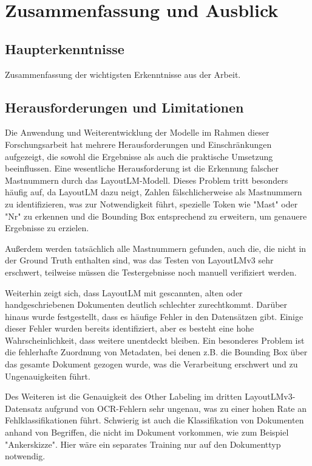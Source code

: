\documentclass[12pt,a4paper,twoside]{article}
\begin{document}
\section{Zusammenfassung und Ausblick}
\subsection{Haupterkenntnisse}
Zusammenfassung der wichtigsten Erkenntnisse aus der Arbeit.

\subsection{Herausforderungen und Limitationen}
Die Anwendung und Weiterentwicklung der Modelle im Rahmen dieser Forschungsarbeit hat mehrere Herausforderungen und Einschränkungen aufgezeigt, die sowohl die Ergebnisse als auch die praktische Umsetzung beeinflussen. Eine wesentliche Herausforderung ist die Erkennung falscher Mastnummern durch das LayoutLM-Modell. Dieses Problem tritt besonders häufig auf, da LayoutLM dazu neigt, Zahlen fälschlicherweise als Mastnummern zu identifizieren, was zur Notwendigkeit führt, spezielle Token wie "Mast" oder "Nr" zu erkennen und die Bounding Box entsprechend zu erweitern, um genauere Ergebnisse zu erzielen.

Außerdem werden tatsächlich alle Mastnummern gefunden, auch die, die nicht in der Ground Truth enthalten sind, was das Testen von LayoutLMv3 sehr erschwert, teilweise müssen die Testergebnisse noch manuell verifiziert werden.

Weiterhin zeigt sich, dass LayoutLM mit gescannten, alten oder handgeschriebenen Dokumenten deutlich schlechter zurechtkommt. Darüber hinaus wurde festgestellt, dass es häufige Fehler in den Datensätzen gibt. Einige dieser Fehler wurden bereits identifiziert, aber es besteht eine hohe Wahrscheinlichkeit, dass weitere unentdeckt bleiben. Ein besonderes Problem ist die fehlerhafte Zuordnung von Metadaten, bei denen z.B. die Bounding Box über das gesamte Dokument gezogen wurde, was die Verarbeitung erschwert und zu Ungenauigkeiten führt.

Des Weiteren ist die Genauigkeit des Other Labeling im dritten LayoutLMv3-Datensatz aufgrund von OCR-Fehlern sehr ungenau, was zu einer hohen Rate an Fehlklassifikationen führt. Schwierig ist auch die Klassifikation von Dokumenten anhand von Begriffen, die nicht im Dokument vorkommen, wie zum Beispiel "Ankerskizze". Hier wäre ein separates Training nur auf den Dokumenttyp notwendig.
\end{document}
